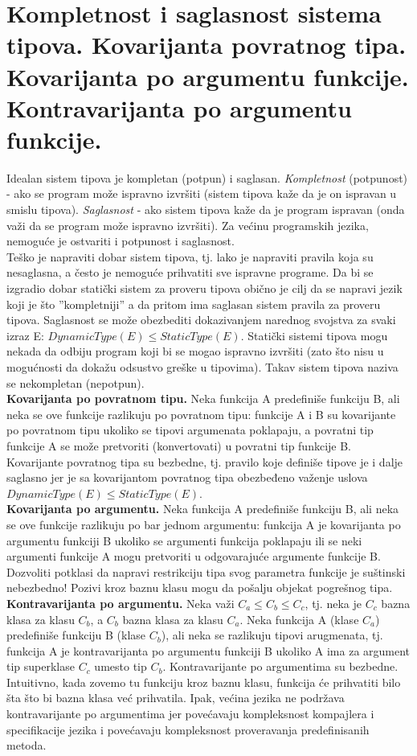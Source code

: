 \documentclass[10pt]{extarticle}
\begin{document}
\section{Kompletnost i saglasnost sistema tipova. Kovarijanta povratnog tipa. Kovarijanta po argumentu funkcije. Kontravarijanta po argumentu funkcije.}
\noindent
Idealan sistem tipova je kompletan (potpun) i saglasan. \textit{Kompletnost} (potpunost) - ako se program može ispravno izvršiti (sistem tipova kaže da je on ispravan u smislu tipova). \textit{Saglasnost} - ako sistem tipova kaže da je program ispravan (onda važi da se program može ispravno izvršiti). Za većinu programskih jezika, nemoguće je ostvariti i potpunost i saglasnost. \\
Teško je napraviti dobar sistem tipova, tj. lako je napraviti pravila koja su nesaglasna, a često je nemoguće prihvatiti sve ispravne programe. Da bi se izgradio dobar statički sistem za proveru tipova obično je cilj da se napravi jezik koji je što ”kompletniji” a da pritom ima saglasan sistem pravila za proveru tipova.
Saglasnost se može obezbediti dokazivanjem narednog svojstva za svaki izraz E: $DynamicType(E)\leq StaticType(E)$. 
Statički sistemi tipova mogu nekada da odbiju program koji bi se mogao ispravno izvršiti (zato što nisu u mogućnosti da dokažu odsustvo greške u tipovima). Takav sistem tipova naziva se nekompletan (nepotpun). \\
\textbf{Kovarijanta po povratnom tipu.} Neka funkcija A predefiniše funkciju B, ali neka se ove funkcije razlikuju po povratnom tipu: funkcije A i B su kovarijante po povratnom tipu ukoliko se tipovi argumenata poklapaju, a povratni tip funkcije A se može pretvoriti (konvertovati) u povratni tip funkcije B. Kovarijante povratnog tipa su bezbedne, tj. pravilo koje definiše tipove je i dalje saglasno jer je sa kovarijantom povratnog tipa obezbeđeno važenje uslova $DynamicType(E)\leq StaticType(E)$.\\
\textbf{Kovarijanta po argumentu.} Neka funkcija A predefiniše funkciju B, ali neka se ove funkcije razlikuju po bar jednom argumentu: funkcija A je kovarijanta po argumentu funkciji B ukoliko se argumenti funkcija poklapaju ili se neki argumenti funkcije A mogu pretvoriti u odgovarajuće argumente funkcije B.
Dozvoliti potklasi da napravi restrikciju tipa svog parametra funkcije je suštinski nebezbedno! Pozivi kroz baznu klasu mogu da pošalju objekat pogrešnog tipa. \\
\textbf{Kontravarijanta po argumentu.} Neka važi $C_a \leq C_b \leq C_c$, tj. neka je $C_c$ bazna klasa za klasu $C_b$, a $C_b$ bazna klasa za klasu $C_a$. Neka funkcija A (klase $C_a$) predefiniše funkciju B (klase $C_b$), ali neka se razlikuju tipovi arugmenata, tj. funkcija A je kontravarijanta po argumentu funkciji B ukoliko A ima za argument tip superklase $C_c$ umesto tip $C_b$.
Kontravarijante po argumentima su bezbedne. Intuitivno, kada zovemo tu funkciju kroz baznu klasu, funkcija će prihvatiti bilo šta što bi bazna klasa već prihvatila. Ipak, većina jezika ne podržava kontravarijante po argumentima jer povećavaju kompleksnost kompajlera i specifikacije jezika i povećavaju kompleksnost proveravanja predefinisanih metoda.
\end{document}
